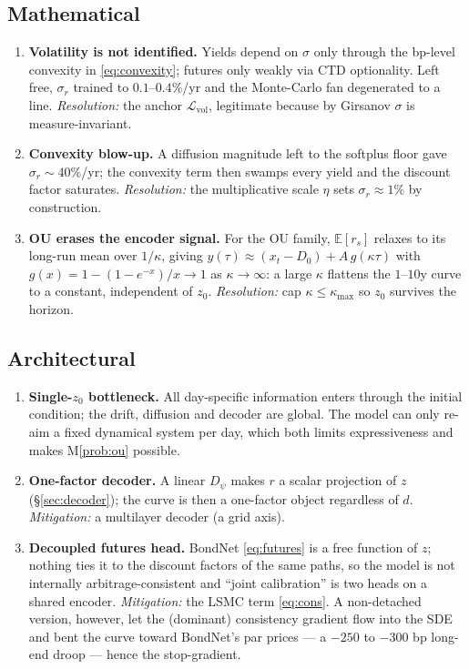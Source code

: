 \documentclass[11pt]{article}
\newcommand{\E}{\mathbb{E}}
\begin{document}
\subsection{Mathematical}
\begin{enumerate}[leftmargin=2em,label=\textbf{M\arabic*.}]
\item\label{prob:vol} \textbf{Volatility is not identified.} Yields depend on
$\sigma$ only through the bp-level convexity in \eqref{eq:convexity}; futures
only weakly via CTD optionality. Left free, $\sigma_r$ trained to
$0.1$--$0.4\%$/yr and the Monte-Carlo fan degenerated to a line.
\emph{Resolution:} the anchor $\mathcal L_{\text{vol}}$, legitimate because by
Girsanov $\sigma$ is measure-invariant.
\item\label{prob:convexity} \textbf{Convexity blow-up.} A diffusion magnitude
left to the softplus floor gave $\sigma_r\sim40\%$/yr; the convexity term then
swamps every yield and the discount factor saturates.
\emph{Resolution:} the multiplicative scale $\eta$ sets $\sigma_r\approx1\%$ by
construction.
\item\label{prob:ou} \textbf{OU erases the encoder signal.} For the OU family,
$\E[r_s]$ relaxes to its long-run mean over $1/\kappa$, giving
$y(\tau)\approx (x_t-D_0)+A\,g(\kappa\tau)$ with
$g(x)=1-(1-e^{-x})/x\to1$ as $\kappa\to\infty$: a large $\kappa$ flattens the
$1$--$10$y curve to a constant, independent of $z_0$.
\emph{Resolution:} cap $\kappa\le\kappa_{\max}$ so $z_0$ survives the horizon.
\end{enumerate}

\subsection{Architectural}
\begin{enumerate}[leftmargin=2em,label=\textbf{A\arabic*.}]
\item\label{prob:z0} \textbf{Single-$z_0$ bottleneck.} All day-specific
information enters through the initial condition; the drift, diffusion and
decoder are global. The model can only re-aim a fixed dynamical system per
day, which both limits expressiveness and makes M\ref{prob:ou} possible.
\item\label{prob:onefactor} \textbf{One-factor decoder.} A linear $D_\psi$
makes $r$ a scalar projection of $z$ (\S\ref{sec:decoder}); the curve is then a
one-factor object regardless of $d$.
\emph{Mitigation:} a multilayer decoder (a grid axis).
\item\label{prob:decouple} \textbf{Decoupled futures head.} BondNet
\eqref{eq:futures} is a free function of $z$; nothing ties it to the discount
factors of the same paths, so the model is not internally arbitrage-consistent
and ``joint calibration'' is two heads on a shared encoder.
\emph{Mitigation:} the LSMC term \eqref{eq:cons}. A non-detached version,
however, let the (dominant) consistency gradient flow into the SDE and bent the
curve toward BondNet's par prices --- a $-250$ to $-300$ bp long-end droop ---
hence the stop-gradient.
\end{enumerate}
\end{document}
